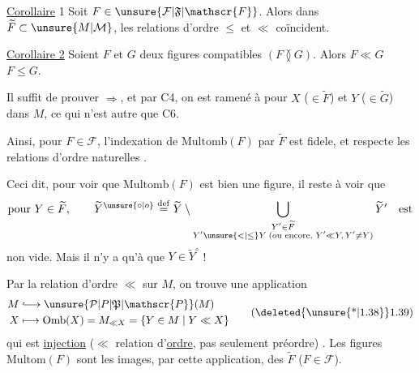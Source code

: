 
\uline{Corollaire} 1 Soit $F\in\unsure{\mathcal{F}|\mathfrak{F}|\mathscr{F}}$. Alors dans $\widetilde F\subset\unsure{M|\mathcal{M}}$, les relations d'ordre $\leq$ et $\ll$ coïncident.

\uline{Corollaire 2} Soient $F$ et $G$ deux figures compatibles $(F\between G)$. Alors $F\ll G$  $F\leq G$.

Il suffit de prouver $\Longrightarrow$, et par C4, on est ramené à  pour $X$ ($\in\widetilde F$) et $Y$ ($\in\widetilde G$) dans $M$, ce qui n'est autre que C6.

Ainsi, pour  $F\in\mathcal{F}$, l'indexation de $\mathrm{Multomb}(F)$ par $\widetilde F$ est fidele, et respecte les relations d'ordre naturelles .

Ceci  dit, pour voir que $\mathrm{Multomb}(F)$ est bien une figure, il reste à voir que
\[
 \text{pour }Y\in\widetilde F,\qquad \widetilde Y^{\unsure{\circ|o}}\overset{\mathrm{def}}{=}
 \widetilde Y\setminus
 \bigcup_{\substack{Y'\in\widetilde F\\Y'\unsure{<|\leq}Y\;(\text{ou encore, }Y'\ll Y,\,Y'\ne Y)}}\widetilde Y'\quad\text{est}
\]
non vide. Mais il n'y a qu'à  que $Y\in\widetilde Y^\circ$ !


Par la relation d'ordre $\ll$ sur $M$, on trouve une application
\[
 \begin{aligned}
 M&\lhook\joinrel\longrightarrow\unsure{\mathcal{P}|P|\mathfrak{P}|\mathscr{P}}(M)\\
 X&\longmapsto\mathrm{Omb}(X)=M_{\ll X}=\{Y\in M\mid Y\ll X\}
 \end{aligned}
 \tag*{(\deleted{\unsure{*|1.38}}1.39)}
\]
qui est \uline{injection} ($\ll$ relation d'\uline{ordre}, pas seulement préordre) . Les figures $\mathrm{Multom}(F)$ sont les images, par cette application, des $\widetilde F$ ($F\in\mathcal{F}$). 
